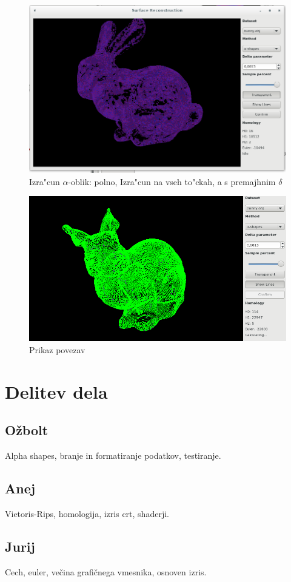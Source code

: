\documentclass[11pt]{article}
\begin{document}
\begin{figure}[htb]
    \centering
    \includegraphics[width=1\textwidth]{alpha_lowdelta.png}
    \caption{Izra"cun $\alpha$-oblik: polno, Izra"cun na vseh to"ckah, a s premajhnim $\delta$}
    \label{fig:a1}
\end{figure}

\begin{figure}[htb]
    \centering
    \includegraphics[width=\textwidth]{lines.png}
    \caption{Prikaz povezav}
    \label{fig:edges}
\end{figure}

\newpage %

\section{Delitev dela}

\subsection{Ožbolt}
Alpha shapes, branje in formatiranje podatkov, testiranje. 

\subsection{Anej}
Vietoris-Rips, homologija, izris crt, shaderji.

\subsection{Jurij}
Cech, euler, večina grafičnega vmesnika, osnoven izris.



\end{document}

